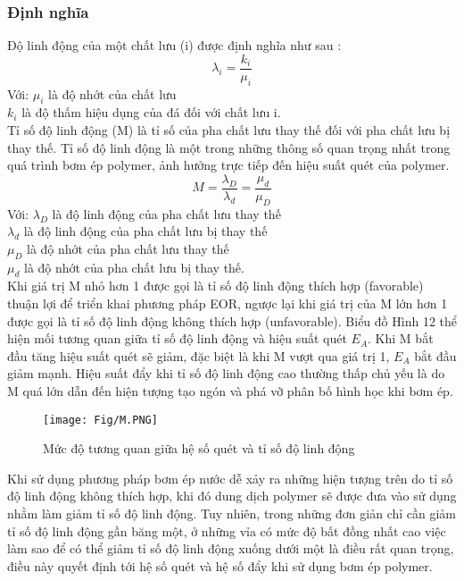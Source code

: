 \documentclass[12pt,a4paper]{article}
\begin{document}
	\subsubsection{Định nghĩa}
	Độ linh động của một chất lưu (i) được định nghĩa như sau \cite{kantzas2012fundamentals}:
		\begin{equation}
			\lambda_i = \frac{k_i}{\mu_i}
		\end{equation}
	Với:\hspace{15pt} $\mu_i$ là độ nhớt của chất lưu\\
		 \hspace*{37pt}$k_i$ là độ thấm hiệu dụng của đá đối với chất lưu i.\\
	Tỉ số độ linh động (M) \cite{kantzas2012fundamentals} là tỉ số của pha chất lưu thay thế đối với pha chất lưu bị thay thế. Tỉ số độ linh động là một trong những thông số quan trọng nhất trong quá trình bơm ép polymer, ảnh hưởng trực tiếp đến hiệu suất quét của polymer.
		\begin{equation*}
			M = \frac{\lambda_D}{\lambda_d} = \frac{\mu_d}{\mu_D}
		\end{equation*}
	Với: \hspace{15pt}$\lambda_D$ là độ linh động của pha chất lưu thay thế\\
	\hspace*{37pt}$\lambda_d$ là độ linh động của pha chất lưu bị thay thế\\
	\hspace*{37pt}$\mu_D$ là độ nhớt của pha chất lưu thay thế\\
	\hspace*{37pt}$\mu_d$ là độ nhớt của pha chất lưu bị thay thế.\\
	Khi giá trị M nhỏ hơn 1 được gọi là tỉ số độ linh động thích hợp (favorable) thuận lợi để triển khai phương pháp EOR, ngược lại khi giá trị của M lớn hơn 1 được gọi là tỉ số độ linh động không thích hợp (unfavorable). Biểu đồ Hình 12 thể hiện mối tương quan giữa tỉ số độ linh động và hiệu suất quét $E_A$. Khi M bắt đầu tăng hiệu suất quét sẽ giảm, đặc biệt là khi M vượt qua giá trị 1, $E_A$ bắt đầu giảm mạnh. Hiệu suất đẩy khi tỉ số độ linh động cao thường thấp chủ yếu là do M quá lớn dẫn đến hiện tượng tạo ngón và phá vỡ phân bố hình học khi bơm ép. 
		\begin{figure}[h]
			\centering
			\texttt{[image: Fig/M.PNG]}
			\caption{Mức độ tương quan giữa hệ số quét và tỉ số độ linh động \cite{kantzas2012fundamentals}}
		\end{figure}
	\newline
	Khi sử dụng phương pháp bơm ép nước dễ xảy ra những hiện tượng trên do tỉ số độ linh động không thích hợp, khi đó dung dịch polymer sẽ được đưa vào sử dụng nhằm làm giảm tỉ số độ linh động. Tuy nhiên, trong những đơn giản chỉ cần giảm tỉ số độ linh động gần băng một, ở những vỉa có mức độ bất đồng nhất cao việc làm sao để có thể giảm tỉ số độ linh động xuống dưới một là điều rất quan trọng, điều này quyết định tới hệ số quét và hệ số đẩy khi sử dụng bơm ép polymer. 
\end{document}
